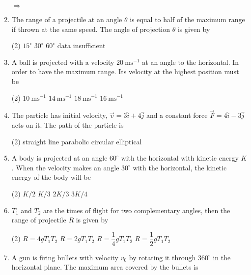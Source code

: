 \documentclass{article}
\renewcommand{\frac}[2]{\dfrac{#1}{#2}}
\newenvironment{solution}{\par\noindent\color{red!85!black}$\Rightarrow$\vspace{0em}}{}
\begin{document}
\begin{enumerate}
\begin{solution}
    \end{solution}
    \item The range of a projectile at an angle $\theta$ is equal to half of the maximum range if thrown at the same speed. The angle of projection $\theta$ is given by
        \begin{tasks}(2)
            	\task $15^\circ$
            	\task $30^\circ$
            	\task $60^\circ$
            	\task data insufficient
        \end{tasks}
    \item A ball is projected with a velocity $20\ \mathrm{ms}^{-1}$ at an angle to the horizontal. In order to have the maximum range. Its velocity at the highest position must be
        \begin{tasks}(2)
            	\task $10\ \mathrm{ms}^{-1}$
            	\task $14\ \mathrm{ms}^{-1}$
            	\task $18\ \mathrm{ms}^{-1}$
            	\task $16\ \mathrm{ms}^{-1}$
        \end{tasks}
    \item The particle has initial velocity, $\vec{v} = 3\hat{i} + 4\hat{j}$ and a constant force $\vec{F} = 4\hat{i} - 3\hat{j}$ acts on it. The path of the particle is
        \begin{tasks}(2)
            	\task straight line
            	\task parabolic
            	\task circular
            	\task elliptical
        \end{tasks}
    \item A body is projected at an angle $60^\circ$ with the horizontal with kinetic energy $K$. When the velocity makes an angle $30^\circ$ with the horizontal, the kinetic energy of the body will be
        \begin{tasks}(2)
            	\task $K/2$
            	\task $K/3$
            	\task $2K/3$
            	\task $3K/4$
        \end{tasks}
    \item $T_1$ and $T_2$ are the times of flight for two complementary angles, then the range of projectile $R$ is given by
        \begin{tasks}(2)
            	\task $R = 4gT_1T_2$
            	\task $R = 2gT_1T_2$
            	\task $R = \frac{1}{4}gT_1T_2$
            	\task $R = \frac{1}{2}gT_1T_2$
        \end{tasks}
    \item A gun is firing bullets with velocity $v_0$ by rotating it through $360^\circ$ in the horizontal plane. The maximum area covered by the bullets is

\end{enumerate}
\end{document}
